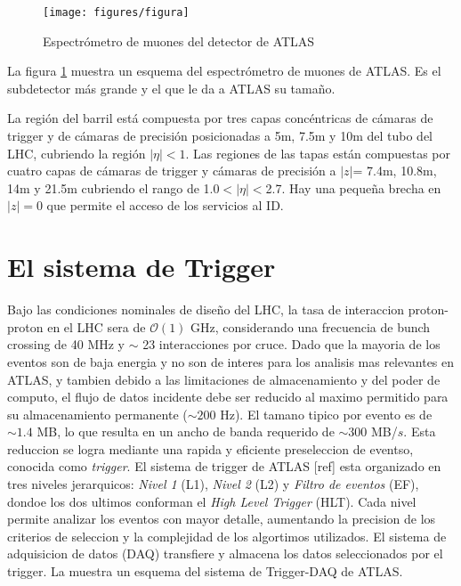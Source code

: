 \begin{figure}[H]
  \centering
  \texttt{[image: figures/figura]}
  \caption{Espectrómetro de muones del detector de ATLAS}\label{fig:especmuones}
\end{figure}

La figura \ref{fig:especmuones} muestra un esquema del espectrómetro de muones de ATLAS.
Es el subdetector más grande y el que le da a ATLAS su tamaño.

La región del barril está compuesta por tres capas concéntricas de cámaras de trigger
y de cámaras de precisión posicionadas a  5m, 7.5m y 10m del tubo del LHC, cubriendo
la región $|\eta|<1$.
Las regiones de las tapas están compuestas por cuatro capas de cámaras de trigger y
cámaras de precisión a $|z|$= 7.4m, 10.8m, 14m y 21.5m cubriendo el rango de 1.0$<|\eta|<$2.7.
Hay una pequeña brecha en $|z|=0$ que permite el acceso de los servicios al ID.

\section{El sistema de Trigger}

Bajo las condiciones nominales de dise\~no del LHC, la tasa de interaccion proton-proton
en el LHC sera de $\mathcal{O}(1)$ GHz, considerando una frecuencia de bunch crossing
de 40 MHz y $\sim$ 23 interacciones por cruce. Dado que la mayoria de los eventos son
de baja energia y no son de interes para los analisis mas relevantes en ATLAS, y tambien
debido a las limitaciones de almacenamiento y del poder de computo, el flujo de datos
incidente debe ser reducido al maximo permitido para su almacenamiento permanente
($\sim 200$ Hz). El tamano tipico por evento es de $\sim 1.4$ MB, lo que resulta en un
ancho de banda requerido de $\sim 300$ MB/$s$. Esta reduccion se logra mediante una rapida
y eficiente preseleccion de eventso, conocida como \emph{trigger}. El sistema de trigger
de ATLAS [ref] esta organizado en tres niveles jerarquicos: \emph{Nivel 1} (L1),
\emph{Nivel 2} (L2) y \emph{Filtro de eventos} (EF), dondoe los dos ultimos conforman
el \emph{High Level Trigger} (HLT). Cada nivel permite analizar los eventos con mayor detalle,
aumentando la precision de los criterios de seleccion y la complejidad
de los algortimos utilizados. El sistema de adquisicion de datos (DAQ) transfiere y almacena
los datos seleccionados por el trigger. La {\fig} {\XXX} muestra un esquema del sistema de
Trigger-DAQ de ATLAS.

